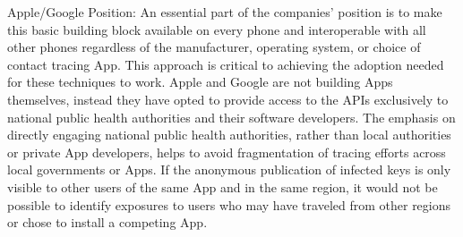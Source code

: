 


Apple/Google Position: An essential part of the companies’ position is to make this basic building block available on every phone and interoperable with all other phones regardless of the manufacturer, operating system, or choice of contact tracing App.
This approach is critical to achieving the adoption needed for these techniques to work.
Apple and Google are not building Apps themselves, instead they have opted to provide access to the APIs exclusively to national public health authorities and their software developers.
The emphasis on directly engaging national public health authorities, rather than local authorities or private App developers, helps to avoid fragmentation of tracing efforts across local governments or Apps.
If the anonymous publication of infected keys is only visible to other users of the same App and in the same region, it would not be possible to identify exposures to users who may have traveled from other regions or chose to install a competing App.


